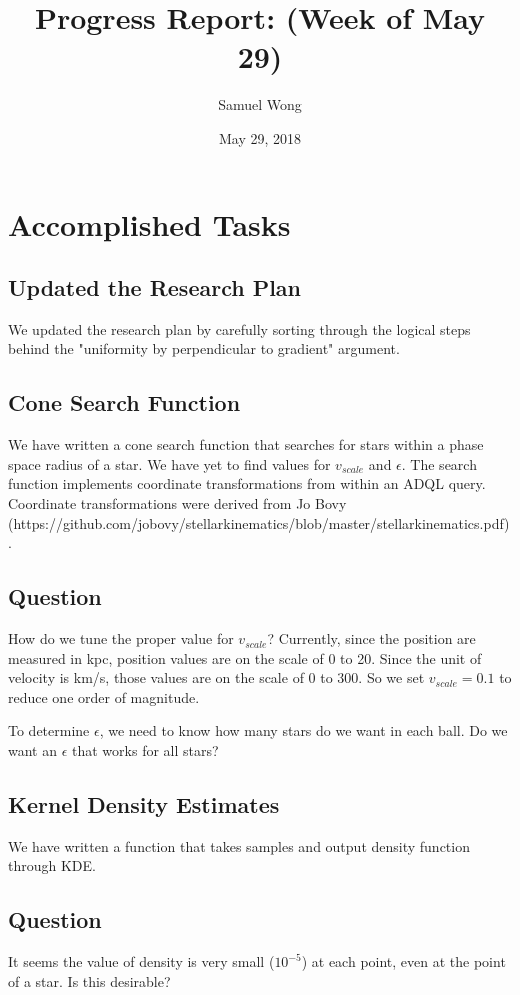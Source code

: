 \documentclass[12pt]{article}
\begin{document}
\title{Progress Report: (Week of May 29)}
\author{Samuel Wong}
\date{May 29, 2018}
\maketitle


\section{Accomplished Tasks}
\subsection{Updated the Research Plan}
We updated the research plan by carefully sorting through the logical steps behind the "uniformity by perpendicular to gradient" argument.
\subsection{Cone Search Function}
We have written a cone search function that searches for stars within a phase space radius of a star. We have yet to find values for $v_{scale}$ and $\epsilon$. The search function implements coordinate transformations from within an ADQL query. Coordinate transformations were derived from Jo Bovy (https://github.com/jobovy/stellarkinematics/blob/master/stellarkinematics.pdf).

\subsection*{Question}
How do we tune the proper value for $v_{scale}$? Currently, since the position are measured in kpc, position values are on the scale of 0 to 20.
Since the unit of velocity is km/s, those values are on the scale of 0 to 300. So we set $v_{scale} = 0.1$ to reduce one order of magnitude.

To determine $\epsilon$, we need to know how many stars do we want in each ball. Do we want an $\epsilon$ that works for all stars?
\subsection{Kernel Density Estimates}
We have written a function that takes samples and output density function through KDE.
\subsection*{Question}
It seems the value of density is very small ($10^{-5}$) at each point, even at the point of a star. Is this desirable?
\end{document}
